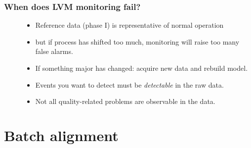 \begin{frame}\frametitle{When does LVM monitoring fail?}

\begin{description} 
	
	\item[] 
	
		\begin{itemize}
			\item	Reference data (phase I) is representative of normal operation
			
			\item	but if process has shifted too much, monitoring will raise too many false alarms.
			
			\item	If something major has changed: acquire new data and rebuild model.
		\end{itemize}
		
	\item[] 
	
		\begin{itemize}
			\item Events you want to detect must be \emph{detectable} in the raw data.
		
			\item	Not all quality-related problems are observable in the data.
		\end{itemize}
		
\end{description}
\end{frame}

\section{Batch alignment}

